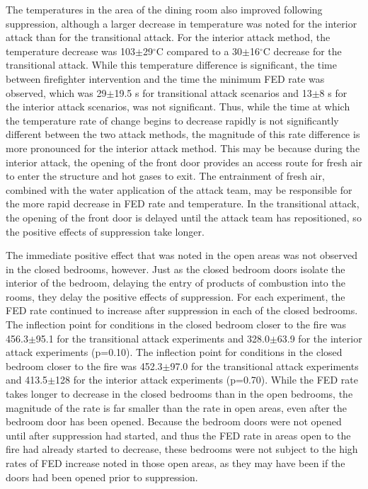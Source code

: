 \documentclass[12pt,oneside]{article}
\begin{document}
The temperatures in the area of the dining room also improved following suppression, although a larger decrease in temperature was noted for the interior attack than for the transitional attack. For the interior attack method, the temperature decrease was 103$\pm$29$^{\circ}$C compared to a 30$\pm$16$^{\circ}$C decrease for the transitional attack. While this temperature difference is significant, the time between firefighter intervention and the time the minimum FED rate was observed, which was 29$\pm$19.5 s for transitional attack scenarios and 13$\pm$8 s for the interior attack scenarios, was not significant. Thus, while the time at which the temperature rate of change begins to decrease rapidly is not significantly different between the two attack methods, the magnitude of this rate difference is more pronounced for the interior attack method. This may be because during the interior attack, the opening of the front door provides an access route for fresh air to enter the structure and hot gases to exit. The entrainment of fresh air, combined with the water application of the attack team, may be responsible for the more rapid decrease in FED rate and temperature. In the transitional attack, the opening of the front door is delayed until the attack team has repositioned, so the positive effects of suppression take longer.

The immediate positive effect that was noted in the open areas was not observed in the closed bedrooms, however. Just as the closed bedroom doors isolate the interior of the bedroom, delaying the entry of products of combustion into the rooms, they delay the positive effects of suppression. For each experiment, the FED rate continued to increase after suppression in each of the closed bedrooms. The inflection point for conditions in the closed bedroom closer to the fire was 456.3$\pm$95.1 for the transitional attack experiments and 328.0$\pm$63.9 for the interior attack experiments (p=0.10).  The inflection point for conditions in the closed bedroom closer to the fire was 452.3$\pm$97.0 for the transitional attack experiments and 413.5$\pm$128 for the interior attack experiments (p=0.70).  While the FED rate takes longer to decrease in the closed bedrooms than in the open bedrooms, the magnitude of the rate is far smaller than the rate in open areas, even after the bedroom door has been opened. Because the bedroom doors were not opened until after suppression had started, and thus the FED rate in areas open to the fire had already started to decrease, these bedrooms were not subject to the high rates of FED increase noted in those open areas, as they may have been if the doors had been opened prior to suppression. 
\end{document}
